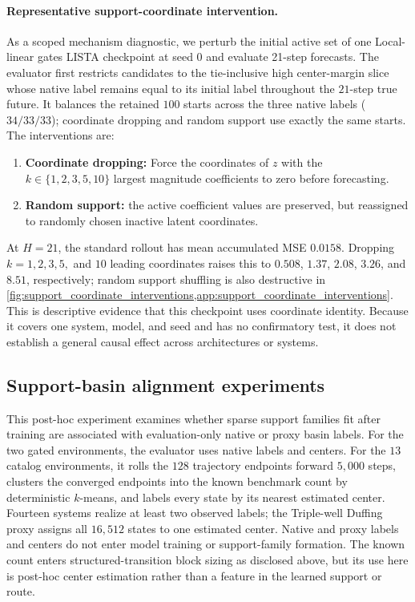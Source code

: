\documentclass[11pt]{article}
\begin{document}
\paragraph{Representative support-coordinate intervention.} As a scoped mechanism diagnostic, we perturb the initial active set of one Local-linear gates LISTA checkpoint at seed \(0\) and evaluate 21-step forecasts. The evaluator first restricts candidates to the tie-inclusive high center-margin slice whose native label remains equal to its initial label throughout the \(21\)-step true future. It balances the retained \(100\) starts across the three native labels (\(34/33/33\)); coordinate dropping and random support use exactly the same starts. The interventions are:
\begin{enumerate}
    \item \textbf{Coordinate dropping:} Force the coordinates of $z$ with the $k\in\{1,2,3,5,10\}$ largest magnitude coefficients to zero before forecasting.
    \item \textbf{Random support:} the active coefficient values are preserved, but reassigned to randomly chosen inactive latent coordinates.
\end{enumerate}

At \(H=21\), the standard rollout has mean accumulated MSE \(0.0158\). Dropping \(k=1,2,3,5,\) and \(10\) leading coordinates raises this to \(0.508\), \(1.37\), \(2.08\), \(3.26\), and \(8.51\), respectively; random support shuffling is also destructive in \cref{fig:support_coordinate_interventions,app:support_coordinate_interventions}. This is descriptive evidence that this checkpoint uses coordinate identity. Because it covers one system, model, and seed and has no confirmatory test, it does not establish a general causal effect across architectures or systems.




\subsection{Support-basin alignment experiments}


This post-hoc experiment examines whether sparse support families fit after training are associated with evaluation-only native or proxy basin labels.
For the two gated environments, the evaluator uses native labels and centers. For the \(13\) catalog environments, it rolls the \(128\) trajectory endpoints forward \(5{,}000\) steps, clusters the converged endpoints into the known benchmark count by deterministic \(k\)-means, and labels every state by its nearest estimated center. Fourteen systems realize at least two observed labels; the Triple-well Duffing proxy assigns all \(16{,}512\) states to one estimated center. Native and proxy labels and centers do not enter model training or support-family formation. The known count enters structured-transition block sizing as disclosed above, but its use here is post-hoc center estimation rather than a feature in the learned support or route.
\end{document}
